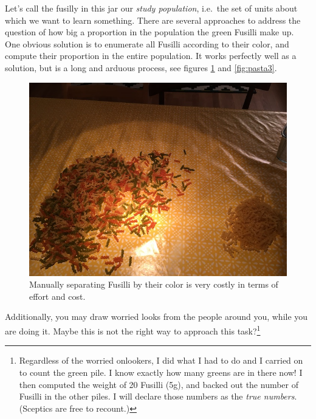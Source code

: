\documentclass[]{book}
\let\rmarkdownfootnote\footnote%
\def\footnote{\protect\rmarkdownfootnote}
\begin{document}
Let's call the fusilly in this jar our \emph{study population}, i.e.~the set of units about which we want to learn something. There are several approaches to address the question of how big a proportion in the population the green Fusilli make up. One obvious solution is to enumerate all Fusilli according to their color, and compute their proportion in the entire population. It works perfectly well as a solution, but is a long and arduous process, see figures \ref{fig:pasta2} and \ref{fig:pasta3}.

\begin{figure}

{\centering \includegraphics[width=0.9\linewidth]{images/pasta2} 

}

\caption{Manually separating Fusilli by their color is very costly in terms of effort and cost.}\label{fig:pasta2}
\end{figure}

Additionally, you may draw worried looks from the people around you, while you are doing it. Maybe this is not the right way to approach this task?\footnote{Regardless of the worried onlookers, I did what I had to do and I carried on to count the green pile. I know exactly how many greens are in there now! I then computed the weight of 20 Fusilli (5g), and backed out the number of Fusilli in the other piles. I will declare those numbers as the \emph{true numbers}. (Sceptics are free to recount.)}
\end{document}
